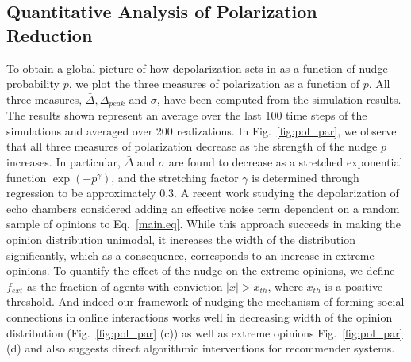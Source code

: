 \subsection{Quantitative Analysis of Polarization Reduction}
To obtain a global picture of how depolarization sets in as a function of nudge probability $p$, we plot the three measures of polarization as a function of $p$. All three measures, $\bar\Delta, \Delta_{peak}$ and $\sigma$, have been computed from the simulation results. The results shown represent an average over the last 100 time steps of the simulations and averaged over 200 realizations. In Fig.~\ref{fig:pol_par}, we observe that all three measures of polarization decrease as the strength of the nudge $p$ increases. In particular, $\bar \Delta$ and $\sigma$ are found to decrease as a stretched exponential function $\exp(-p^\gamma)$, and the stretching factor $\gamma$ is determined through regression to be approximately $0.3$. A recent work studying the depolarization of echo chambers \cite{depolarization-of-echo-chambers-by-random-dynamical-nudge} considered adding an effective noise term dependent on a random sample of opinions to Eq.~\eqref{main.eq}. While this approach succeeds in making the opinion distribution unimodal, it increases the width of the distribution significantly, which as a consequence, corresponds to an increase in extreme opinions. To quantify the effect of the nudge on the extreme opinions, we define $f_{ext}$ as the fraction of agents with conviction $|x| > x_{th}$, where $x_{th}$ is a positive threshold. And indeed our framework of nudging the mechanism of forming social connections in online interactions works well in decreasing width of the opinion distribution (Fig.~\ref{fig:pol_par} (c)) as well as extreme opinions Fig.~\ref{fig:pol_par} (d) and also suggests direct algorithmic interventions for recommender systems.

